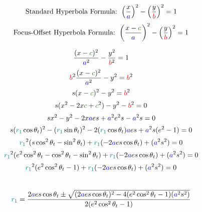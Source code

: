 $$\text{Standard Hyperbola Formula: } \left(\frac{x}{\textcolor{blue}{a}}\right)^2 - \left(\frac{y}{\textcolor{red}{b}}\right)^2 = 1$$
$$\text{Focus-Offset Hyperbola Formula: } \left(\frac{x-\textcolor{OliveGreen}{c}}{\textcolor{blue}{a}}\right)^2 - \left(\frac{y}{\textcolor{red}{b}}\right)^2 = 1$$

$$\frac{(x-\textcolor{OliveGreen}{c})^2}{\textcolor{blue}{a}^2} - \frac{y^2}{\textcolor{red}{b}^2} = 1$$
$$\textcolor{red}{b}^2\frac{(x-\textcolor{OliveGreen}{c})^2}{\textcolor{blue}{a}^2} - y^2 = \textcolor{red}{b}^2$$
$$\textcolor{black}{s}(x-\textcolor{OliveGreen}{c})^2 - y^2 = \textcolor{red}{b}^2$$
$$\textcolor{black}{s}(x^2 - 2x\textcolor{OliveGreen}{c} + \textcolor{OliveGreen}{c}^2) - y^2 - \textcolor{red}{b}^2 = 0$$
$$\textcolor{black}{s}x^2 - y^2 - 2x\textcolor{blue}{a}\textcolor{black}{e}\textcolor{black}{s} +\textcolor{blue}{a}^2\textcolor{black}{e}^2\textcolor{black}{s} - \textcolor{blue}{a}^2\textcolor{black}{s} = 0$$
$$\textcolor{black}{s}(\textcolor{teal}{r_1}\cos{\textcolor{black}{\theta_t}})^2- (\textcolor{teal}{r_1}\sin{\textcolor{black}{\theta_t}})^2- 2(\textcolor{teal}{r_1}\cos{\textcolor{black}{\theta_t}})\textcolor{blue}{a}\textcolor{black}{e}\textcolor{black}{s} +\textcolor{blue}{a}^2\textcolor{black}{s}(\textcolor{black}{e}^2 - 1) = 0$$
$$\textcolor{teal}{r_1}^2(\textcolor{black}{s}\cos^2{\textcolor{black}{\theta_t}} - \sin^2{\textcolor{black}{\theta_t}})+ \textcolor{teal}{r_1}(-2\textcolor{blue}{a}\textcolor{black}{e}\textcolor{black}{s}\cos{\textcolor{black}{\theta_t}}) + (\textcolor{blue}{a}^2\textcolor{black}{s}^2) = 0$$
$$\textcolor{teal}{r_1}^2(\textcolor{black}{e}^2\cos^2{\textcolor{black}{\theta_t}} - \cos^2{\textcolor{black}{\theta_t}} - \sin^2{\textcolor{black}{\theta_t}})+ \textcolor{teal}{r_1}(-2\textcolor{blue}{a}\textcolor{black}{e}\textcolor{black}{s}\cos{\textcolor{black}{\theta_t}}) + (\textcolor{blue}{a}^2\textcolor{black}{s}^2) = 0$$
$$\textcolor{teal}{r_1}^2(\textcolor{black}{e}^2\cos^2{\textcolor{black}{\theta_t}} - 1)+ \textcolor{teal}{r_1}(-2\textcolor{blue}{a}\textcolor{black}{e}\textcolor{black}{s}\cos{\textcolor{black}{\theta_t}}) + (\textcolor{blue}{a}^2\textcolor{black}{s}^2) = 0$$
\\
$$\textcolor{teal}{r_1} = \frac{2\textcolor{blue}{a}\textcolor{black}{e}\textcolor{black}{s}\cos{\textcolor{black}{\theta_t}}\pm\sqrt{(2\textcolor{blue}{a}\textcolor{black}{e}\textcolor{black}{s}\cos{\textcolor{black}{\theta_t}})^2 - 4(\textcolor{black}{e}^2\cos^2{\textcolor{black}{\theta_t}} - 1)(\textcolor{blue}{a}^2\textcolor{black}{s}^2)}}{2(\textcolor{black}{e}^2\cos^2{\textcolor{black}{\theta_t}} - 1)}$$

